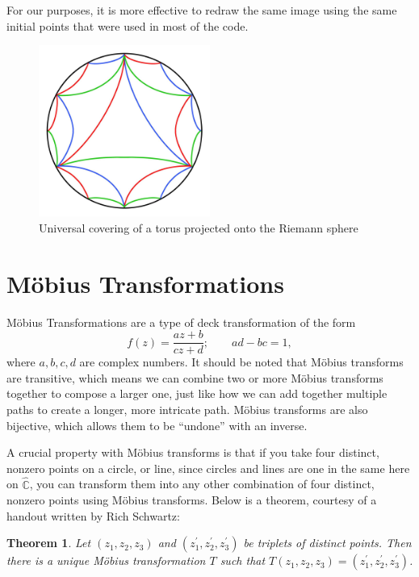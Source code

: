 \documentclass[12pt,a4paper,reqno,parskip=full]{amsart}
\numberwithin{equation}{section}
\theoremstyle{plain}
\newtheorem{theorem}[subsection]{Theorem}
\theoremstyle{definition}
\def\C{{\mathbb C}}
\begin{document}
For our purposes, it is more effective to redraw the same image using the same initial points that were used in most of the code. 
\begin{figure}[H]
    \centering
    \includegraphics[width=0.5\textwidth]{images/photo_2025-05-14_19-31-21.jpg}
    \caption{Universal covering of a torus projected onto the Riemann sphere}
\end{figure}

\section{Möbius Transformations}

Möbius Transformations are a type of deck transformation of the form \[f(z)=\frac{az+b}{cz+d};\quad\quad ad-bc=1,\]
where $a,b,c,d$ are complex numbers. It should be noted that Möbius transforms are transitive, which means we can combine two or more Möbius transforms together to compose a larger one, just like how we can add together multiple paths to create a longer, more intricate path. Möbius transforms are also bijective, which allows them to be ``undone'' with an inverse.

A crucial property with Möbius transforms is that if you take four distinct, nonzero points on a circle, or line, since circles and lines are one in the same here on $\hat\C$, you can transform them into any other combination of four distinct, nonzero points using Möbius transforms. Below is a theorem, courtesy of a handout written by Rich Schwartz: %
\begin{theorem}Let $(z_1,z_2,z_3)$ and $(z_1^\prime,z_2^\prime,z_3^\prime)$ be triplets of distinct points. Then there is a unique Möbius transformation $T$ such that $T(z_1,z_2,z_3)=(z_1^\prime,z_2^\prime,z_3^\prime)$.
\end{theorem}
\end{document}
